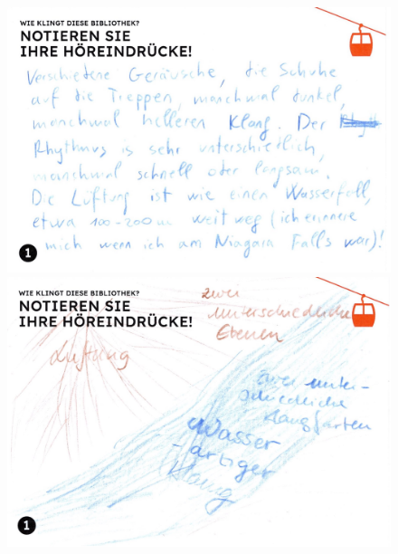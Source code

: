 \documentclass[a4paper,
fontsize=11pt,
oneside,
numbers=noperiodatend,
parskip=half-,
bibliography=totoc,
final
]{scrartcl}
\begin{document}
\begin{figure}[H]
    \centering
    \begin{minipage}[b]{0.45\textwidth}
        \centering
        \includegraphics[width=\textwidth]{img/Abb6.jpg}
    \end{minipage}
    \begin{minipage}[b]{0.45\textwidth}
        \centering
        \includegraphics[width=\textwidth]{img/Abb7.jpg}
    \end{minipage}
    
    \vspace{0.5cm}
    

\end{figure}
\end{document}
